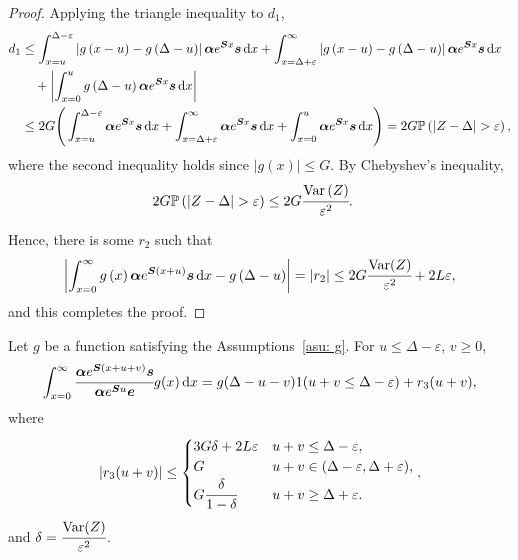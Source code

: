 \begin{proof}
 	Applying the triangle inequality to \(d_1\),
	\begin{align*}
		d_1  &\leq \int_{x=u}^{\Delta-\varepsilon } \left|g\left(x-u\right)- g\left(\Delta-u\right)\right|\bs \alpha  e^{\bs{S} x} \bs s \wrt x
		+ \int_{x=\Delta+\varepsilon }^{\infty} \left|g\left(x-u\right)- g\left(\Delta-u\right)\right|\bs \alpha  e^{\bs{S} x} \bs s \wrt x \nonumber
		\\&\quad{}+ \left|\int_{x=0}^u g\left(\Delta-u\right)\bs \alpha  e^{\bs{S} x} \bs s \wrt x \right| 
		\\& \leq 2G\Bigg( \int_{x=u}^{\Delta-\varepsilon }\bs \alpha  e^{\bs{S} x} \bs s \wrt x
		+ \int_{x=\Delta+\varepsilon }^{\infty}\bs \alpha  e^{\bs{S} x} \bs s \wrt x
		+ \int_{x=0}^u \bs \alpha  e^{\bs{S} x} \bs s \wrt x \Bigg)
		=2G\mathbb P\left(|Z -\Delta|>\varepsilon \right),
	\end{align*}
	where the second inequality holds since \(|g\left(x\right)|\leq G\).
	By Chebyshev's inequality, 
	\begin{align}
		&2G\mathbb P\left(|Z -\Delta|>\varepsilon \right)\leq 2G\cfrac{\var \left(Z \right)}{\varepsilon ^2}.
	\end{align}
	
	Hence, there is some \(r_2\) such that 
	\[\left|\int_{x=0}^\infty g\left(x\right)\boldsymbol \alpha  e^{\boldsymbol{S} \left(x+u\right)} \boldsymbol s \, \mathrm{d} x - g\left(\Delta-u\right)\right| = |r_2| \leq 2G\cfrac{\mathrm{Var}(Z)}{\varepsilon^2} + 2 L \varepsilon,\]
	and this completes the proof. 
\end{proof}
\begin{cor}\label{cor: cond bnd 2}
	Let \(g\) be a function satisfying the Assumptions~\ref{asu: g}. For \(u\leq \Delta-\varepsilon \), \(v\geq 0\), 
	\begin{align}
		\int_{x=0}^\infty \cfrac{\boldsymbol \alpha  e^{\boldsymbol{S} (x+u+v)} \boldsymbol s}{\boldsymbol \alpha  e^{\boldsymbol{S} u} \boldsymbol e} g(x)\, \mathrm{d} x = g(\Delta-u-v) 1(u+v\leq\Delta-\varepsilon) + r_3 (u+v),\label{eqn: ssss}
	\end{align}
	where 
	\[\left|r_3 (u+v)\right|\leq \begin{cases} 
		3G\delta + 2L\varepsilon & u+v\leq \Delta-\varepsilon,\\
		G & u+v\in(\Delta-\varepsilon,\Delta+\varepsilon), \\
		G\cfrac{\delta}{1-\delta} & u+v \geq \Delta + \varepsilon.
		\end{cases},\]
	and \(\delta = \cfrac{\mathrm{Var}(Z)}{\varepsilon^2}\). 
\end{cor}
